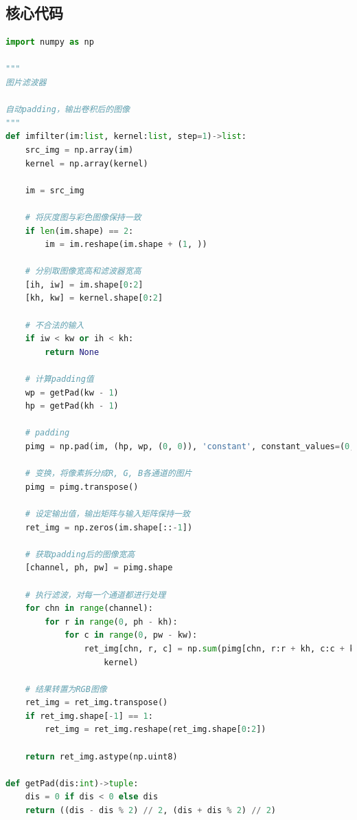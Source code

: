 \documentclass{article}
\begin{document}
\subsection{核心代码}
\begin{lstlisting}[language=Python, frame=shadowbox]
import numpy as np

"""
图片滤波器

自动padding，输出卷积后的图像
"""
def imfilter(im:list, kernel:list, step=1)->list:
    src_img = np.array(im)
    kernel = np.array(kernel)

    im = src_img

    # 将灰度图与彩色图像保持一致
    if len(im.shape) == 2:
        im = im.reshape(im.shape + (1, ))

    # 分别取图像宽高和滤波器宽高
    [ih, iw] = im.shape[0:2]
    [kh, kw] = kernel.shape[0:2]
    
    # 不合法的输入
    if iw < kw or ih < kh:
        return None

    # 计算padding值
    wp = getPad(kw - 1)
    hp = getPad(kh - 1)

    # padding
    pimg = np.pad(im, (hp, wp, (0, 0)), 'constant', constant_values=(0, 0))

    # 变换，将像素拆分成R, G, B各通道的图片
    pimg = pimg.transpose()

    # 设定输出值，输出矩阵与输入矩阵保持一致
    ret_img = np.zeros(im.shape[::-1])

    # 获取padding后的图像宽高
    [channel, ph, pw] = pimg.shape

    # 执行滤波，对每一个通道都进行处理
    for chn in range(channel):
        for r in range(0, ph - kh):
            for c in range(0, pw - kw):
                ret_img[chn, r, c] = np.sum(pimg[chn, r:r + kh, c:c + kw] * \
                    kernel)

    # 结果转置为RGB图像
    ret_img = ret_img.transpose()
    if ret_img.shape[-1] == 1:
        ret_img = ret_img.reshape(ret_img.shape[0:2])

    return ret_img.astype(np.uint8)

def getPad(dis:int)->tuple:
    dis = 0 if dis < 0 else dis
    return ((dis - dis % 2) // 2, (dis + dis % 2) // 2)
\end{lstlisting}
\end{document}
